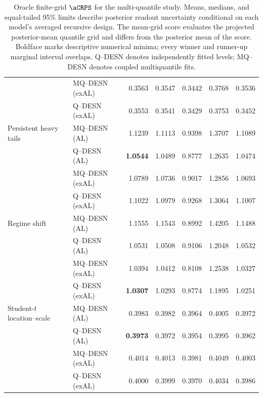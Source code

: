\begin{table}[p]
\begin{tabular}{@{}>{\raggedright\arraybackslash}p{}>{\raggedright\arraybackslash}p{}rrrrr@{}}
 & MQ--DESN (exAL) & 0.3563 & 0.3547 & 0.3442 & 0.3768 & 0.3536 \\
 & Q--DESN (exAL) & 0.3553 & 0.3541 & 0.3429 & 0.3753 & 0.3452 \\
\addlinespace[2pt]
Persistent heavy tails & MQ--DESN (AL) & 1.1239 & 1.1113 & 0.9398 & 1.3707 & 1.1089 \\
 & Q--DESN (AL) & \textbf{1.0544} & 1.0489 & 0.8777 & 1.2635 & 1.0474 \\
 & MQ--DESN (exAL) & 1.0789 & 1.0736 & 0.9017 & 1.2856 & 1.0693 \\
 & Q--DESN (exAL) & 1.1022 & 1.0979 & 0.9268 & 1.3064 & 1.1007 \\
\addlinespace[2pt]
Regime shift & MQ--DESN (AL) & 1.1555 & 1.1543 & 0.8992 & 1.4205 & 1.1488 \\
 & Q--DESN (AL) & 1.0531 & 1.0508 & 0.9106 & 1.2048 & 1.0532 \\
 & MQ--DESN (exAL) & 1.0394 & 1.0412 & 0.8108 & 1.2538 & 1.0327 \\
 & Q--DESN (exAL) & \textbf{1.0307} & 1.0293 & 0.8774 & 1.1895 & 1.0251 \\
\addlinespace[2pt]
Student-\(t\) location--scale & MQ--DESN (AL) & 0.3983 & 0.3982 & 0.3964 & 0.4005 & 0.3972 \\
 & Q--DESN (AL) & \textbf{0.3973} & 0.3972 & 0.3954 & 0.3995 & 0.3962 \\
 & MQ--DESN (exAL) & 0.4014 & 0.4013 & 0.3981 & 0.4049 & 0.4003 \\
 & Q--DESN (exAL) & 0.4000 & 0.3999 & 0.3970 & 0.4034 & 0.3986 \\
\bottomrule
\end{tabular}
\caption{Oracle finite-grid \(\aCRPS\) for the multi-quantile study. Means, medians, and equal-tailed 95\% limits describe posterior readout uncertainty conditional on each model's averaged recursive design. The mean-grid score evaluates the projected posterior-mean quantile grid and differs from the posterior mean of the score. Boldface marks descriptive numerical minima; every winner and runner-up marginal interval overlaps. Q--DESN denotes independently fitted levels; MQ--DESN denotes coupled multiquantile fits.}
\label{tab:joint-qdesn-pure-desn-v2-score}
\end{table}
